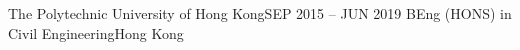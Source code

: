 \resumeSubHeadingListStart
\resumeSubheading
{The Polytechnic University of Hong Kong}{SEP 2015 -- JUN 2019}
{BEng (HONS) in Civil Engineering}{Hong Kong}
\resumeSubHeadingListEnd